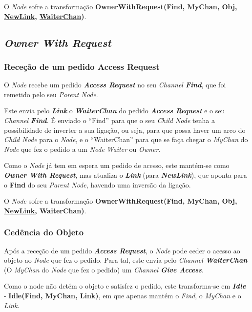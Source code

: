 O \emph{Node} sofre a transformação \textbf{OwnerWithRequest(Find, MyChan, Obj, \underline{NewLink}, \underline{WaiterChan})}.



\subsection*{\emph{Owner With Request}}
\label{especificacao:nodes:owner_with_request}

\subsubsection*{Receção de um pedido Access Request}
O \emph{Node} recebe um pedido \emph{\textbf{Access Request}} no seu \emph{Channel \textbf{Find}},
que foi remetido pelo seu \emph{Parent Node}.

Este envia pelo \textbf{\emph{Link}} o \textbf{\emph{WaiterChan}} do pedido \emph{\textbf{Access Request}} e o seu \emph{Channel \textbf{Find}}.
É enviado o ``Find'' para que o seu \emph{Child Node} tenha a possibilidade de inverter a sua ligação, ou seja, para que possa haver um arco do \emph{Child Node} para o \emph{Node}, 
e o ``WaiterChan'' para que se faça chegar o \emph{MyChan} do \emph{Node} que fez o pedido a um \emph{Node} \emph{Waiter} ou \emph{Owner}.

Como o \emph{Node} já tem em espera um pedido de acesso, este mantém-se como \emph{\textbf{Owner With Request}},
mas atualiza o \textbf{\emph{Link}} (para \textbf{\emph{NewLink}}),
que aponta para o \textbf{Find} do seu \emph{Parent Node}, havendo uma inversão da ligação.

O \emph{Node} sofre a transformação \textbf{OwnerWithRequest(Find, MyChan, Obj, \underline{NewLink}, WaiterChan)}.


\subsubsection*{Cedência do Objeto}
Após a receção de um pedido \emph{\textbf{Access Request}}, o \emph{Node} pode ceder o acesso ao objeto ao \emph{Node} que fez o pedido.
Para tal, este envia pelo \emph{Channel \textbf{WaiterChan}} (O \emph{MyChan} do \emph{Node} que fez o pedido) um \emph{Channel \textbf{Give Access}}.

Como o node não detém o objeto e satisfez o pedido, este transforma-se em \emph{\textbf{Idle}} - \textbf{Idle(Find, MyChan, Link)}, em que apenas
mantém o \emph{Find}, o \emph{MyChan} e o \emph{Link}.





